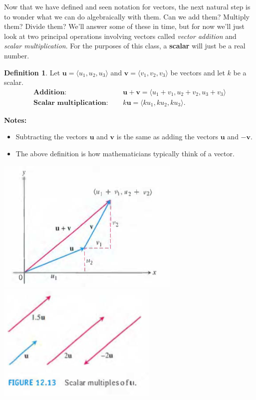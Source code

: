 \documentclass[12pt, letter]{article}
\theoremstyle{plain}
\numberwithin{theorem}{section}
\theoremstyle{definition}
\newtheorem{definition}[theorem]{Definition}
\begin{document}
\bigskip

\hrulefill

\bigskip

Now that we have defined and seen notation for vectors, the next natural step is to wonder what we can do algebraically with them. Can we add them? Multiply them? Divide them? We'll answer some of these in time, but for now we'll just look at two principal operations involving vectors called \textit{vector addition} and \textit{scalar multiplication}. For the purposes of this class, a \textbf{scalar} will just be a real number.

\bigskip

\begin{definition}
Let $\bm{u} = \langle u_1,u_2,u_3 \rangle$ and $\bm{v} = \langle v_1, v_2, v_3 \rangle$ be vectors and let $k$ be a scalar.\\
\begin{align*}
\textbf{Addition:} \ \ \ \ \ \ \ &\bm{u}+\bm{v} = \langle u_1+v_1, u_2+v_2, u_3+v_3 \rangle\\
\textbf{Scalar multiplication:} \ \ \ \ \ \ &k\bm{u} = \langle ku_1, ku_2, ku_3 \rangle.
\end{align*}
\end{definition}

\bigskip

\textbf{Notes:} 
\begin{itemize}
\item Subtracting the vectors $\bm{u}$ and $\bm{v}$ is the same as adding the vectors $\bm{u}$ and $-\bm{v}$.
\item The above definition is how mathematicians typically think of a vector.
\end{itemize}

\bigskip

\begin{center}
  \includegraphics[scale = 0.5]{m1_f4}
  \includegraphics[scale = 0.5]{m1_f5}
\end{center}
\end{document}

